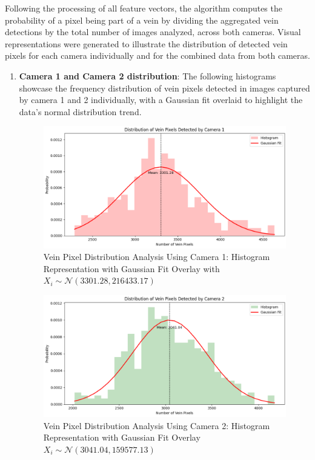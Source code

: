 Following the processing of all feature vectors, the algorithm computes the probability of a pixel being part of a vein by dividing the aggregated vein detections by the total number of images analyzed, across both cameras. Visual representations were generated to illustrate the distribution of detected vein pixels for each camera individually and for the combined data from both cameras.

\begin{enumerate}
    \item \textbf{Camera 1 and Camera 2 distribution}: The following histograms showcase the frequency distribution of vein pixels detected in images captured by camera 1 and 2 individually, with a Gaussian fit overlaid to highlight the data's normal distribution trend.

    \begin{figure}[H]
        \centering
        \includegraphics[width=1\linewidth]{latex-img/distribution_veins_cam1.png}
        \caption{Vein Pixel Distribution Analysis Using Camera 1: Histogram Representation with Gaussian Fit Overlay with \(X_i \sim \mathcal{N}(3301.28, 216433.17)\)}
        \label{distribution_veins_cam1}
    \end{figure}

    \begin{figure}[H]
        \centering
        \includegraphics[width=1\linewidth]{latex-img/distribution_veins_cam2.png}
        \caption{Vein Pixel Distribution Analysis Using Camera 2: Histogram Representation with Gaussian Fit Overlay \(X_i \sim \mathcal{N}(3041.04, 159577.13)\)}
        \label{distribution_veins_cam2}
    \end{figure}
 

\end{enumerate}
